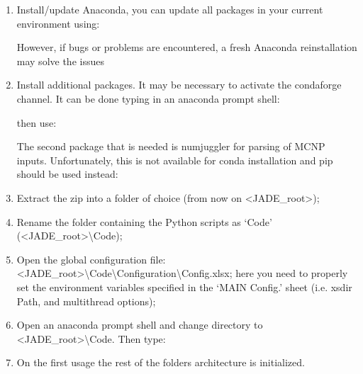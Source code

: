 \documentclass[letterpaper,10pt,english]{sphinxmanual}
\begin{document}
\begin{enumerate}
%
\item {} 
Install/update Anaconda, you can update all packages in your current environment using:


However, if bugs or problems are encountered, a fresh Anaconda re\sphinxhyphen{}installation may solve the issues

\item {} 
Install additional packages. It may be necessary to activate the conda\sphinxhyphen{}forge channel. It can be done typing in an anaconda prompt shell:


then use:


The second package that is needed is numjuggler for parsing of MCNP inputs.
Unfortunately, this is not available for conda installation and pip should be used instead:


\item {} 
Extract the zip into a folder of choice (from now on \textless{}JADE\_root\textgreater{});

\item {} 
Rename the folder containing the Python scripts as ‘Code’ (\textless{}JADE\_root\textgreater{}\textbackslash{}Code);

\item {} 
Open the global configuration file: \textless{}JADE\_root\textgreater{}\textbackslash{}Code\textbackslash{}Configuration\textbackslash{}Config.xlsx;
here you need to properly set the environment variables specified in the ‘MAIN Config.’ sheet (i.e. xsdir Path, and multithread options);

\item {} 
Open an anaconda prompt shell and change directory to \textless{}JADE\_root\textgreater{}\textbackslash{}Code. Then type:


\item {} 
On the first usage the rest of the folders architecture is initialized.

\end{enumerate}
\end{document}
